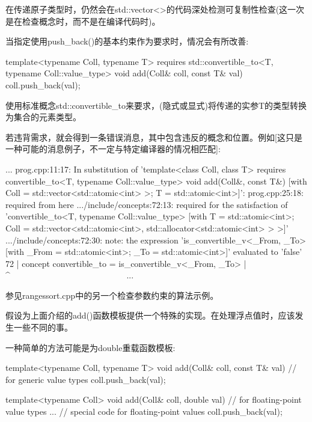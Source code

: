 在传递原子类型时，仍然会在std::vector<>的代码深处检测可复制性检查(这一次是在检查概念时，而不是在编译代码时)。

当指定使用push\_back()的基本约束作为要求时，情况会有所改善:

\begin{cpp}
template<typename Coll, typename T>
requires std::convertible_to<T, typename Coll::value_type>
void add(Coll& coll, const T& val)
{
	coll.push_back(val);
}
\end{cpp}

使用标准概念std::convertible\_to来要求，(隐式或显式)将传递的实参T的类型转换为集合的元素类型。

若违背需求，就会得到一条错误消息，其中包含违反的概念和位置。例如[这只是一种可能的消息例子，不一定与特定编译器的情况相匹配]:

{\footnotesize
\begin{shell}
...
prog.cpp:11:17: In substitution of ’template<class Coll, class T>
                 requires convertible_to<T, typename Coll::value_type>
                 void add(Coll&, const T&)
                [with Coll = std::vector<std::atomic<int> >; T = std::atomic<int>]’:
prog.cpp:25:18: required from here
.../include/concepts:72:13: required for the satisfaction of
                 ’convertible_to<T, typename Coll::value_type>
                  [with T = std::atomic<int>;
                      Coll = std::vector<std::atomic<int>,
                                              std::allocator<std::atomic<int> > >]’
.../include/concepts:72:30: note: the expression ’is_convertible_v<_From, _To>
                      [with _From = std::atomic<int>; _To = std::atomic<int>]’
                      evaluated to ’false’
    72 | concept convertible_to = is_convertible_v<_From, _To>
        |                                    ^~~~~~~~~~~~~~~~~~~~~~~~~~~~
...
\end{shell}
}

参见rangessort.cpp中的另一个检查参数约束的算法示例。


假设为上面介绍的add()函数模板提供一个特殊的实现。在处理浮点值时，应该发生一些不同的事。

一种简单的方法可能是为double重载函数模板:

\begin{cpp}
template<typename Coll, typename T>
void add(Coll& coll, const T& val) // for generic value types
{
	coll.push_back(val);
}

template<typename Coll>
void add(Coll& coll, double val) // for floating-point value types
{
	... // special code for floating-point values
	coll.push_back(val);
}
\end{cpp}

